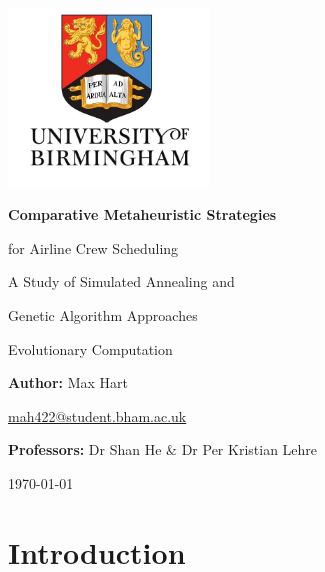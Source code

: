 \documentclass[12pt]{article}
\begin{document}
\begin{titlepage}
    \centering
    \vspace*{1cm}
    
    \includegraphics[width=0.4\textwidth]{images/UoB.jpg}\par\vspace{1cm}
    
    {\LARGE\bfseries Comparative Metaheuristic Strategies\par for Airline Crew Scheduling\par}
    \vspace{0.5cm}
    {\Large A Study of Simulated Annealing and\par Genetic Algorithm Approaches\par}
    \vspace{0.75cm}
    
    {\large Evolutionary Computation\par}
    \vspace{1.5cm}
    
    {\large\textbf{Author:} Max Hart\par}
    \vspace{0.3cm}
    {\normalsize \href{mailto:mah422@student.bham.ac.uk}{mah422@student.bham.ac.uk}\par}
    \vspace{1.5cm}
    
    {\large\textbf{Professors:} Dr Shan He \& Dr Per Kristian Lehre\par}
    \vspace{1cm}
    
    {\large \today\par}
    
\end{titlepage}

\tableofcontents

\newpage

\section{Introduction}
\end{document}
